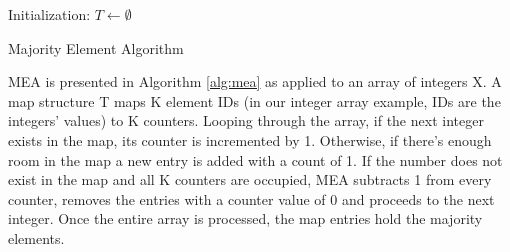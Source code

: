 

\begin{algorithm}[t]
 \DontPrintSemicolon
 \;
 \PrintSemicolon
 
 \DontPrintSemicolon
 \;
 Initialization: $T \leftarrow \emptyset$\; 
 \;
 \PrintSemicolon
  {
 }
 \caption{Majority Element Algorithm}
 \label{alg:mea}
 
  
  
  
\end{algorithm}


MEA is presented in Algorithm \ref{alg:mea} as applied to an array of integers X. A map structure T maps K element IDs (in our integer array example, IDs are the integers' values) to K counters. Looping through the array, if the next integer exists in the map, its counter is incremented by 1. Otherwise, if there's enough room in the map a new entry is added with a count of 1. If the number does not exist in the map and all K counters are occupied, MEA subtracts 1 from every counter, removes the entries with a counter value of 0 and proceeds to the next integer. Once the entire array is processed, the map entries hold the majority elements. 

